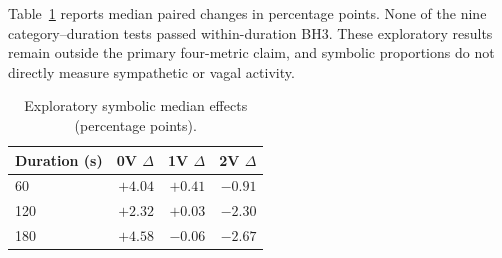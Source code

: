 \documentclass[conference,a4paper]{IEEEtran}
\begin{document}
Table~\ref{tab:supp_symbolic} reports median paired changes in percentage points. None of the nine category--duration tests passed within-duration BH3. These exploratory results remain outside the primary four-metric claim, and symbolic proportions do not directly measure sympathetic or vagal activity.

\begin{table}[!htbp]
\centering
\caption{Exploratory symbolic median effects (percentage points).}
\label{tab:supp_symbolic}
\footnotesize
\setlength{\tabcolsep}{5pt}
\renewcommand{\arraystretch}{1.05}

\begin{tabular}{@{}lrrr@{}}
\toprule
Duration (s) & 0V $\Delta$ & 1V $\Delta$ & 2V $\Delta$\\
\midrule
60  & $+4.04$ & $+0.41$ & $-0.91$\\
120 & $+2.32$ & $+0.03$ & $-2.30$\\
180 & $+4.58$ & $-0.06$ & $-2.67$\\
\bottomrule
\end{tabular}
\end{table}
\end{document}
